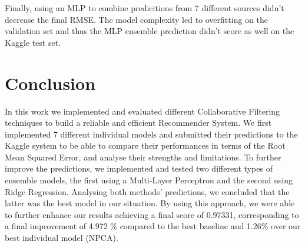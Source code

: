 \documentclass[10pt,conference,compsocconf]{IEEEtran}
\begin{document}
Finally, using an MLP to combine predicitions from 7 different sources didn't decrease the final RMSE. The model complexity led to overfitting on the validation set and thus the MLP ensemble prediction didn't score as well on the Kaggle test set.
\fi


\section{Conclusion}
\label{conc}

In this work we implemented and evaluated different Collaborative Filtering techniques to build a reliable and efficient Recommender System. We first implemented 7 different individual models and submitted their predictions to the Kaggle system to be able to compare their performances in terms of the Root Mean Squared Error, and analyse their strengths and limitations. To further improve the predictions, we implemented and tested two different types of ensemble models, the first using a Multi-Layer Perceptron and the second using Ridge Regression. Analysing both methods' predictions, we concluded that the latter was the best model in our situation. By using this approach, we were able to further enhance our results achieving a final score of 0.97331, corresponding to a final improvement of 4.972 \% compared to the best baseline and 1.26\% over our best individual model (NPCA).




\end{document}
